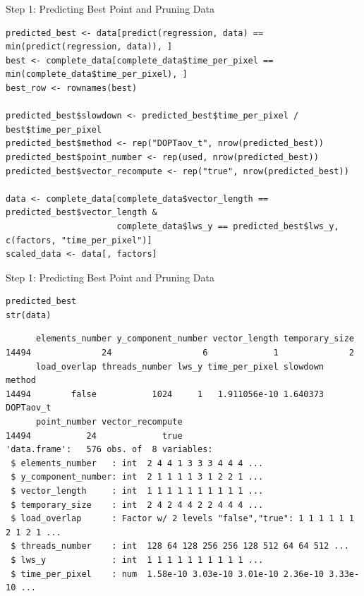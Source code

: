 \documentclass[10pt, compress, aspectratio=169, xcolor={table,usenames,dvipsnames}]{beamer}
\begin{document}
\begin{frame}[fragile,label={sec:org74d9003}]{Step 1: Predicting Best Point and Pruning Data}
 \lstset{language=r,label= ,caption= ,captionpos=b,numbers=none}
\begin{lstlisting}
predicted_best <- data[predict(regression, data) == min(predict(regression, data)), ]
best <- complete_data[complete_data$time_per_pixel == min(complete_data$time_per_pixel), ]
best_row <- rownames(best)

predicted_best$slowdown <- predicted_best$time_per_pixel / best$time_per_pixel
predicted_best$method <- rep("DOPTaov_t", nrow(predicted_best))
predicted_best$point_number <- rep(used, nrow(predicted_best))
predicted_best$vector_recompute <- rep("true", nrow(predicted_best))

data <- complete_data[complete_data$vector_length == predicted_best$vector_length &
                      complete_data$lws_y == predicted_best$lws_y, c(factors, "time_per_pixel")]
scaled_data <- data[, factors]
\end{lstlisting}
\end{frame}
\begin{frame}[fragile,label={sec:org7e38353}]{Step 1: Predicting Best Point and Pruning Data}
 \scriptsize
\lstset{language=r,label= ,caption= ,captionpos=b,numbers=none}
\begin{lstlisting}
predicted_best
str(data)
\end{lstlisting}

\begin{verbatim}
      elements_number y_component_number vector_length temporary_size
14494              24                  6             1              2
      load_overlap threads_number lws_y time_per_pixel slowdown    method
14494        false           1024     1   1.911056e-10 1.640373 DOPTaov_t
      point_number vector_recompute
14494           24             true
'data.frame':	576 obs. of  8 variables:
 $ elements_number   : int  2 4 4 1 3 3 3 4 4 4 ...
 $ y_component_number: int  2 1 1 1 1 3 1 2 2 1 ...
 $ vector_length     : int  1 1 1 1 1 1 1 1 1 1 ...
 $ temporary_size    : int  2 4 2 4 4 2 2 4 4 4 ...
 $ load_overlap      : Factor w/ 2 levels "false","true": 1 1 1 1 1 1 2 1 2 1 ...
 $ threads_number    : int  128 64 128 256 256 128 512 64 64 512 ...
 $ lws_y             : int  1 1 1 1 1 1 1 1 1 1 ...
 $ time_per_pixel    : num  1.58e-10 3.03e-10 3.01e-10 2.36e-10 3.33e-10 ...
\end{verbatim}
\normalsize
\end{frame}
\end{document}
